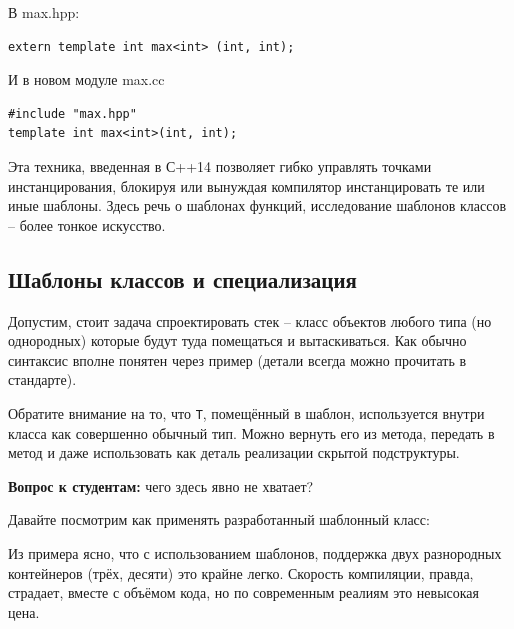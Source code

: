 \documentclass[a4paper,12pt,oneside]{article}
\newif\ifanswers
\begin{document}
В max.hpp:

\begin{lstlisting}
extern template int max<int> (int, int);
\end{lstlisting}

И в новом модуле max.cc

\begin{lstlisting}
#include "max.hpp"
template int max<int>(int, int);
\end{lstlisting}

Эта техника, введенная в С++14 позволяет гибко управлять точками инстанцирования, блокируя или вынуждая компилятор инстанцировать те или иные шаблоны. Здесь речь о шаблонах функций, исследование шаблонов классов -- более тонкое искусство.

\pagebreak
\subsection{Шаблоны классов и специализация}\label{ClassTemplates}

Допустим, стоит задача спроектировать стек – класс объектов любого типа (но однородных) которые будут туда помещаться и вытаскиваться. Как обычно синтаксис вполне понятен через пример (детали всегда можно прочитать в стандарте).



Обратите внимание на то, что \lstinline!T!, помещённый в шаблон, используется внутри класса как совершенно обычный тип. Можно вернуть его из метода, передать в метод и даже использовать как деталь реализации скрытой подструктуры.



\textbf{Вопрос к студентам:} чего здесь явно не хватает?

\ifanswers
Ожидается хоровой ответ: деструктор, копирующий конструктор и оператор присваивания. Позвать кого-нибудь к доске разобрать как их писать.
\fi

Давайте посмотрим как применять разработанный шаблонный класс:



Из примера ясно, что с использованием шаблонов, поддержка двух разнородных контейнеров (трёх, десяти) это крайне легко. Скорость компиляции, правда, страдает, вместе с объёмом кода, но по современным реалиям это невысокая цена.
\end{document}
